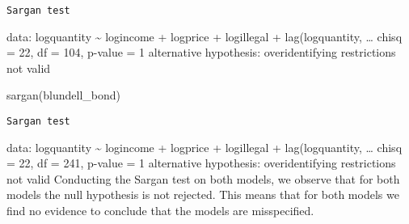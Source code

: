 \documentclass[
]{article}
\newenvironment{Shaded}{\begin{snugshade}}{\end{snugshade}}
\newcommand{\FunctionTok}[1]{\textcolor[rgb]{0.00,0.00,0.00}{#1}}
\newcommand{\NormalTok}[1]{#1}
\let\oldShaded\Shaded
\let\endoldShaded\endShaded
\renewenvironment{Shaded}{\footnotesize\oldShaded}{\endoldShaded}
\begin{document}
\begin{verbatim}
Sargan test
\end{verbatim}

data: logquantity \textasciitilde{} logincome + logprice + logillegal +
lag(logquantity, \ldots{} chisq = 22, df = 104, p-value = 1 alternative
hypothesis: overidentifying restrictions not valid

\begin{Shaded}
\begin{Highlighting}[]
\FunctionTok{sargan}\NormalTok{(blundell\_bond)}
\end{Highlighting}
\end{Shaded}

\begin{verbatim}
Sargan test
\end{verbatim}

data: logquantity \textasciitilde{} logincome + logprice + logillegal +
lag(logquantity, \ldots{} chisq = 22, df = 241, p-value = 1 alternative
hypothesis: overidentifying restrictions not valid Conducting the Sargan
test on both models, we observe that for both models the null hypothesis
is not rejected. This means that for both models we find no evidence to
conclude that the models are misspecified.
\end{document}
